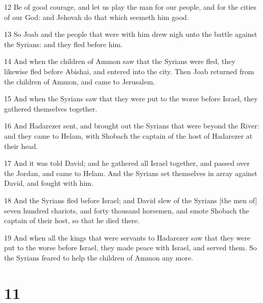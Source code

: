 \par 12 Be of good courage, and let us play the man for our people, and for the cities of our God: and Jehovah do that which seemeth him good.
\par 13 So Joab and the people that were with him drew nigh unto the battle against the Syrians: and they fled before him.
\par 14 And when the children of Ammon saw that the Syrians were fled, they likewise fled before Abishai, and entered into the city. Then Joab returned from the children of Ammon, and came to Jerusalem.
\par 15 And when the Syrians saw that they were put to the worse before Israel, they gathered themselves together.
\par 16 And Hadarezer sent, and brought out the Syrians that were beyond the River: and they came to Helam, with Shobach the captain of the host of Hadarezer at their head.
\par 17 And it was told David; and he gathered all Israel together, and passed over the Jordan, and came to Helam. And the Syrians set themselves in array against David, and fought with him.
\par 18 And the Syrians fled before Israel; and David slew of the Syrians [the men of] seven hundred chariots, and forty thousand horsemen, and smote Shobach the captain of their host, so that he died there.
\par 19 And when all the kings that were servants to Hadarezer saw that they were put to the worse before Israel, they made peace with Israel, and served them. So the Syrians feared to help the children of Ammon any more.

\chapter{11}

